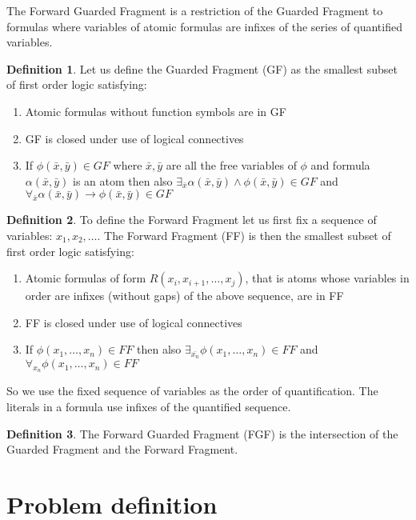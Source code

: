 \documentclass[english, shortabstract]{iithesis}
\theoremstyle{definition} \newtheorem{definition}{Definition}[chapter]
\theoremstyle{remark} \newtheorem{remark}[definition]{Observation}
\theoremstyle{plain} \newtheorem{theorem}[definition]{Theorem}
\theoremstyle{plain} \newtheorem{lemma}[definition]{Lemma}
\begin{document}
The Forward Guarded Fragment is a restriction of the Guarded Fragment to formulas where variables of atomic formulas are infixes of the series of quantified variables. 
\begin{definition}
Let us define the Guarded Fragment (GF) as the smallest subset of first order logic satisfying:
\begin{enumerate}
    \item Atomic formulas without function symbols are in GF
    \item GF is closed under use of logical connectives
    \item If $\phi(\bar{x}, \bar{y}) \in \mathit{GF}$ where $\bar{x}, \bar{y}$ are all the free variables of $\phi$ and formula $\alpha(\bar{x},\bar{y})$ is an atom
then also $\exists_{\bar{x}} \alpha(\bar{x}, \bar{y}) \land \phi(\bar{x}, \bar{y}) \in \mathit{GF}$ and $\forall_{\bar{x}} \alpha(\bar{x}, \bar{y}) \rightarrow \phi(\bar{x}, \bar{y}) \in \mathit{GF}$
\end{enumerate}
\end{definition}
\begin{definition}
To define the Forward Fragment let us first fix a sequence of variables: $x_1, x_2, \dots$. The Forward Fragment (FF) is then the smallest subset of first order logic satisfying:
\begin{enumerate}
    \item Atomic formulas of form $R(x_i, x_{i+1},\dots,x_{j})$, that is atoms whose variables in order are infixes (without gaps) of the above sequence, are in FF
    \item FF is closed under use of logical connectives
    \item If $\phi(x_1,\dots, x_{n}) \in \mathit{FF}$ then also $\exists_{\bar{x_{n}}} \phi(x_1,\dots, x_{n}) \in FF$ and $\forall_{x_n} \phi(x_1,\dots, x_{n}) \in \mathit{FF}$
\end{enumerate}
\end{definition}
So we use the fixed sequence of variables as the order of quantification. The literals in a formula use infixes of the quantified sequence.
\begin{definition}
The Forward Guarded Fragment (FGF) is the intersection of the Guarded Fragment and the Forward Fragment.
\end{definition}

\section{Problem definition}
\end{document}
